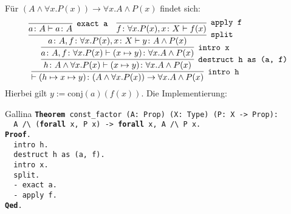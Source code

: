 \documentclass[8pt]{beamer}
\newcommand{\kw}[1]{\textbf{#1}}
\begin{document}
\begin{frame}
Für $(A\land\forall x. P(x))\to\forall x. A\land P(x)$ findet sich:\pause
\[
\infer[\texttt{intro h}]{\vdash (h\mapsto x\mapsto y)\colon (A\land\forall x. P(x))\to\forall x. A\land P(x)}{
  \infer[\texttt{destruct h as (a, f)}]{h\colon A\land\forall x. P(x)\vdash (x\mapsto y)\colon\forall x.A\land P(x)}{
    \infer[\texttt{intro x}]{a\colon A, f\colon \forall x.P(x)\vdash (x\mapsto y)\colon\forall x.A\land P(x)}{
      \infer[\texttt{split}]{a\colon A, f\colon \forall x.P(x), x\colon X\vdash y\colon A\land P(x)}{
        \infer[\texttt{exact a}]{a\colon A\vdash a\colon A}{}
      & \infer[\texttt{apply f}]{f\colon\forall x.P(x), x\colon X\vdash f(x)}{}}}}}
\]
Hierbei gilt $y:=\mathrm{conj}(a)(f(x))$. Die Implementierung:\pause

\begin{block}{Gallina}
\texttt{\kw{Theorem} const\_factor (A: Prop) (X: Type) (P: X -> Prop):\\
\ \ A /{\textbackslash} (\kw{forall} x, P x) -> \kw{forall} x, A /{\textbackslash} P x.\\
\kw{Proof}.\\
\ \ intro h.\\
\ \ destruct h as (a, f).\\
\ \ intro x.\\
\ \ split.\\
\ \ - exact a.\\
\ \ - apply f.\\
\kw{Qed}.}
\end{block}
\end{frame}
\end{document}
